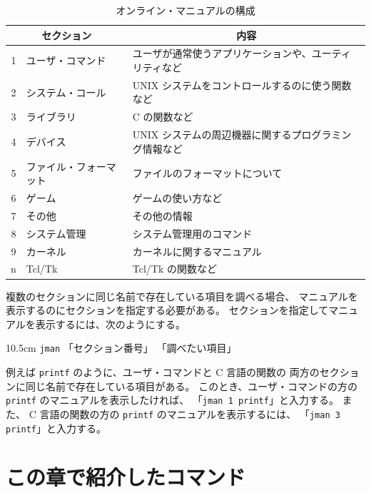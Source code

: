 \begin{table}[H]
\caption{オンライン・マニュアルの構成}
\begin{center}
\renewcommand{\arraystretch}{1.5}
\begin{tabular}{|cl|l|}
\hline
\multicolumn{2}{|c|}{\textbf{セクション}} & \multicolumn{1}{c|}{\textbf{内容}}\\
\hline
1 & ユーザ・コマンド & ユーザが通常使うアプリケーションや、ユーティリティなど\\
2 & システム・コール & UNIX システムをコントロールするのに使う関数など\\
3 & ライブラリ & C の関数など\\
4 & デバイス &  UNIX システムの周辺機器に関するプログラミング情報など\\
5 & ファイル・フォーマット & ファイルのフォーマットについて\\
6 & ゲーム & ゲームの使い方など\\
7 & その他 & その他の情報\\
8 & システム管理 & システム管理用のコマンド\\
9 & カーネル & カーネルに関するマニュアル\\
n & Tcl/Tk & Tcl/Tk の関数など\\
\hline
\end{tabular}
\end{center}
\end{table}

複数のセクションに同じ名前で存在している項目を調べる場合、
マニュアルを表示するのにセクションを指定する必要がある。
セクションを指定してマニュアルを表示するには、次のようにする。

\begin{coml}{10.5cm}
\texttt{jman} 「セクション番号」 「調べたい項目」
\end{coml}

例えば \texttt{printf} のように、ユーザ・コマンドと C 言語の関数の
両方のセクションに同じ名前で存在している項目がある。
このとき、ユーザ・コマンドの方の \texttt{printf} のマニュアルを表示したければ、
「\texttt{jman 1 printf}」と入力する。
また、 C 言語の関数の方の \texttt{printf} のマニュアルを表示するには、
「\texttt{jman 3 printf}」と入力する。


\section*{この章で紹介したコマンド}

